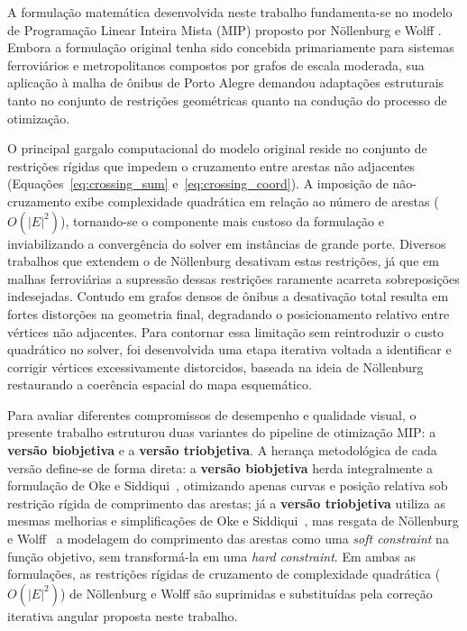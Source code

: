 \documentclass[cic,tc]{infufrgs}
\begin{document}
A formulação matemática desenvolvida neste trabalho fundamenta-se no modelo de Programação Linear Inteira Mista (MIP) proposto por Nöllenburg e Wolff \cite{Nollenburg}. Embora a formulação original tenha sido concebida primariamente para sistemas ferroviários e metropolitanos compostos por grafos de escala moderada, sua aplicação à malha de ônibus de Porto Alegre demandou adaptações estruturais tanto no conjunto de restrições geométricas quanto na condução do processo de otimização.

O principal gargalo computacional do modelo original reside no conjunto de restrições rígidas que impedem o cruzamento entre arestas não adjacentes (Equações~\ref{eq:crossing_sum} e~\ref{eq:crossing_coord}). A imposição de não-cruzamento exibe complexidade quadrática em relação ao número de arestas ($O(|E|^2)$), tornando-se o componente mais custoso da formulação e inviabilizando a convergência do solver em instâncias de grande porte. Diversos trabalhos que extendem o de Nöllenburg desativam estas restrições, já que em malhas ferroviárias a supressão dessas restrições raramente acarreta sobreposições indesejadas. Contudo em grafos densos de ônibus a desativação total resulta em fortes distorções na geometria final, degradando o posicionamento relativo entre vértices não adjacentes. Para contornar essa limitação sem reintroduzir o custo quadrático no solver, foi desenvolvida uma etapa iterativa voltada a identificar e corrigir vértices excessivamente distorcidos, baseada na ideia de Nöllenburg restaurando a coerência espacial do mapa esquemático.

Para avaliar diferentes compromissos de desempenho e qualidade visual, o presente trabalho estruturou duas variantes do pipeline de otimização MIP: a \textbf{versão biobjetiva} e a \textbf{versão triobjetiva}. A herança metodológica de cada versão define-se de forma direta: a \textbf{versão biobjetiva} herda integralmente a formulação de Oke e Siddiqui~\cite{Oke}, otimizando apenas curvas e posição relativa sob restrição rígida de comprimento das arestas; já a \textbf{versão triobjetiva} utiliza as mesmas melhorias e simplificações de Oke e Siddiqui~\cite{Oke}, mas resgata de Nöllenburg e Wolff~\cite{Nollenburg} a modelagem do comprimento das arestas como uma \textit{soft constraint} na função objetivo, sem transformá-la em uma \textit{hard constraint}. Em ambas as formulações, as restrições rígidas de cruzamento de complexidade quadrática ($O(|E|^2)$) de Nöllenburg e Wolff são suprimidas e substituídas pela correção iterativa angular proposta neste trabalho.
\end{document}
